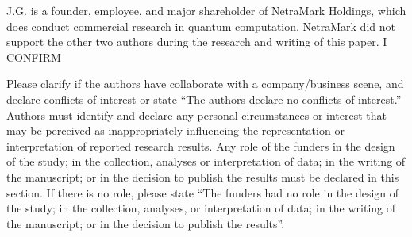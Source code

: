 \documentclass[technologies,article,accept,pdftex,moreauthors]{Definitions/mdpi}
\begin{document}
\informedconsent{\hl{~~~}}%

\dataavailability{\hl{~~~}}%



\conflictsofinterest{\hl{~~~}}%

J.G. is a founder, employee, and major shareholder of NetraMark Holdings, which does conduct commercial research in quantum computation. NetraMark did not support the other two authors during the research and writing of this paper. I CONFIRM

Please clarify if the authors have collaborate with a company/business scene, and declare conflicts of interest or state ``The authors declare no conflicts of interest.'' Authors must identify and declare any personal circumstances or interest that may be perceived as inappropriately influencing the representation or interpretation of reported research results. Any role of the funders in the design of the study; in the collection, analyses or interpretation of data; in the writing of the manuscript; or in the decision to publish the results must be declared in this section. If there is no role, please state ``The funders had no role in the design of the study; in the collection, analyses, or interpretation of data; in the writing of the manuscript; or in the decision to publish the results''. 
\end{document}

